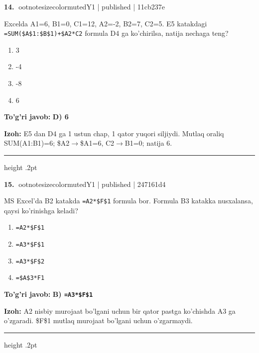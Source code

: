 \documentclass[10pt,a4paper]{article}
\begin{document}
\textbf{\color{ink}14.} {ootnotesizecolor{muted}Y1 | published | 11cb237e}
\par
Excelda A1=6, B1=0, C1=12, A2=-2, B2=7, C2=5. E5 katakdagi \texttt{=SUM(\$A\$1:\$B\$1)+\$A2*C2} formula D4 ga ko'chirilsa, natija nechaga teng?
\begin{enumerate}[label=\Alph*),leftmargin=9mm]
\item 3
\item -4
\item -8
\item 6
\end{enumerate}
\begin{tcolorbox}[enhanced,breakable,colback=teal!4,colframe=teal!55!black,boxrule=0.45pt,arc=1.2mm,left=2.8mm,right=2.8mm,top=2mm,bottom=2mm]
\textbf{\color{teal}To'g'ri javob:} \textbf{D) 6}
\par\smallskip
\textbf{Izoh:} E5 dan D4 ga 1 ustun chap, 1 qator yuqori siljiydi. Mutlaq oraliq SUM(A1:B1)=6; \$A2\ensuremath{\rightarrow}\$A1=6, C2\ensuremath{\rightarrow}B1=0; natija 6.
\end{tcolorbox}
\vspace{2mm}\hrule height .2pt\vspace{2mm}

\textbf{\color{ink}15.} {ootnotesizecolor{muted}Y1 | published | 247161d4}
\par
MS Excel'da B2 katakda \texttt{=A2*\$F\$1} formula bor. Formula B3 katakka nusxalansa, qaysi ko'rinishga keladi?
\begin{enumerate}[label=\Alph*),leftmargin=9mm]
\item \texttt{=A2*\$F\$1}
\item \texttt{=A3*\$F\$1}
\item \texttt{=A3*\$F\$2}
\item \texttt{=\$A\$3*F1}
\end{enumerate}
\begin{tcolorbox}[enhanced,breakable,colback=teal!4,colframe=teal!55!black,boxrule=0.45pt,arc=1.2mm,left=2.8mm,right=2.8mm,top=2mm,bottom=2mm]
\textbf{\color{teal}To'g'ri javob:} \textbf{B) \texttt{=A3*\$F\$1}}
\par\smallskip
\textbf{Izoh:} A2 nisbiy murojaat bo'lgani uchun bir qator pastga ko'chishda A3 ga o'zgaradi. \$F\$1 mutlaq murojaat bo'lgani uchun o'zgarmaydi.
\end{tcolorbox}
\vspace{2mm}\hrule height .2pt\vspace{2mm}
\end{document}
